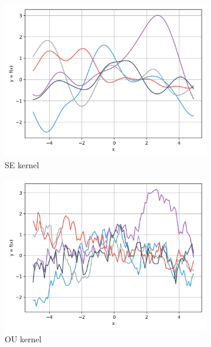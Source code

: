 \documentclass{article}
\begin{document}
\begin{figure}[ht]
  \begin{subfigure}{.245\textwidth}
    \centering
    \includegraphics[width=\linewidth]{kernels/prior/noise-free/kernelSE.png}
    \caption{SE kernel}
    \label{fig:priorSE}
  \end{subfigure}
  \begin{subfigure}{.245\textwidth}
    \centering
    \includegraphics[width=\linewidth]{kernels/prior/noise-free/kernelOU.png}
    \caption{OU kernel}
    \label{fig:priorOU}
  \end{subfigure}
  \begin{subfigure}{.245\textwidth}
    \centering

\end{subfigure}
\end{figure}
\end{document}
